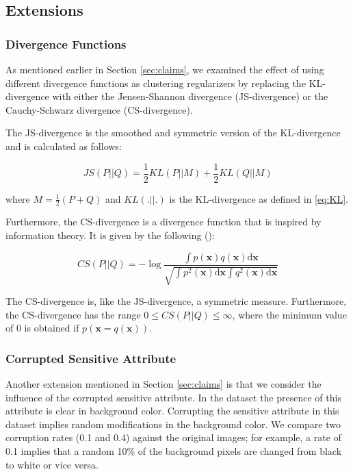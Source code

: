 \subsection{Extensions}

\subsubsection{Divergence Functions}
As mentioned earlier in Section \ref{sec:claims}, we examined the effect of using different divergence functions as clustering regularizers by replacing the KL-divergence with either the Jensen-Shannon divergence (JS-divergence) or the Cauchy-Schwarz divergence (CS-divergence).

The JS-divergence is the smoothed and symmetric version of the KL-divergence and is calculated as follows:

\begin{equation}
    JS(P||Q) = \frac{1}{2}KL(P||M) + \frac{1}{2}KL(Q||M)
    \label{eq:JS}
\end{equation}

where $M = \frac{1}{2}(P + Q)$ and $KL(.||.)$ is the KL-divergence as defined in \ref{eq:KL}.

Furthermore, the CS-divergence is a divergence function that is inspired by information theory. It is given by the following (\cite{Cauchy_Schwarz_divergence}):

\begin{equation}
    CS(P||Q) = -\log \frac{\int p(\textbf{x}) q(\textbf{x}) \text{d}\textbf{x}}{\sqrt{\int p^2(\textbf{x}) \text{d}\textbf{x} \int q^2(\textbf{x}) \text{d}\textbf{x}}}
    \label{eq:CS}
\end{equation}

The CS-divergence is, like the JS-divergence, a symmetric measure. Furthermore, the CS-divergence has the range $0 \leq CS(P || Q) \leq \infty$, where the minimum value of $0$ is obtained if $p(\textbf{x} = q(\textbf{x}))$.

\subsubsection{Corrupted Sensitive Attribute}
Another extension mentioned in Section \ref{sec:claims} is that we consider the influence of the corrupted sensitive attribute. In the \revMNIST dataset the presence of this attribute is clear in background color. Corrupting the sensitive attribute in this dataset implies random modifications in the background color. We compare two corruption rates (0.1 and 0.4) against the original images; for example, a rate of 0.1 implies that a random 10\% of the background pixels are changed from black to white or vice versa. 

